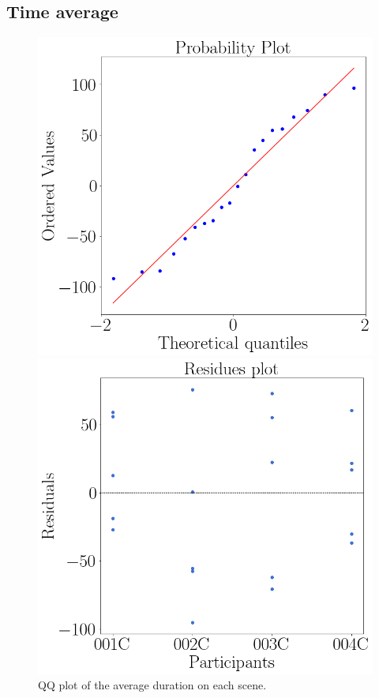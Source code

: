 \subsection{Time average}

    \begin{figure}[!htb]
        \begin{minipage}{0.45\linewidth}
            \centering
            \includegraphics[width = \linewidth]{Resultados/Tempo/Figuras/png/qqplot_duration_avg.png}
            \caption{QQ plot of the average duration on each scene.}
            \label{fig:qqplot_duration_average}
        \end{minipage}
        \begin{minipage}{0.1\linewidth}
            \hfill
        \end{minipage}
        \begin{minipage}{0.45\linewidth}
            \centering
            \includegraphics[width = \linewidth]{Resultados/Tempo/Figuras/png/residplot_duration_avg.png}

\end{minipage}
\end{figure}
